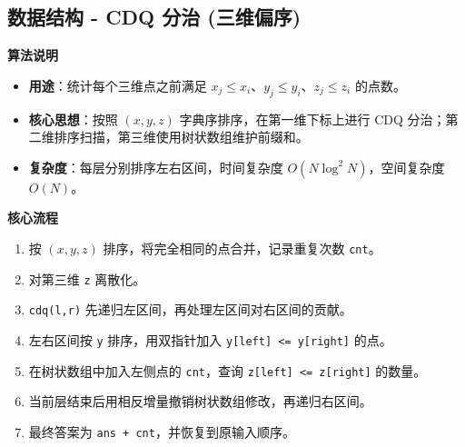 \documentclass[10pt,landscape,a4paper]{article}
\begin{document}
\begin{multicols*}{3}
\subsection*{数据结构 - CDQ 分治 (三维偏序)}
\par\addvspace{0.7ex}\noindent\textbf{算法说明}\par\nobreak
\begin{itemize}
\item \textbf{用途}：统计每个三维点之前满足 $x_j \le x_i$、$y_j \le y_i$、$z_j \le z_i$ 的点数。
\item \textbf{核心思想}：按照 $(x,y,z)$ 字典序排序，在第一维下标上进行 CDQ 分治；第二维排序扫描，第三维使用树状数组维护前缀和。
\item \textbf{复杂度}：每层分别排序左右区间，时间复杂度 $O(N\log^2N)$，空间复杂度 $O(N)$。
\end{itemize}
\par\addvspace{0.7ex}\noindent\textbf{核心流程}\par\nobreak
\begin{enumerate}[start=1]
\item 按 $(x,y,z)$ 排序，将完全相同的点合并，记录重复次数 \texttt{c\allowbreak{}n\allowbreak{}t}。
\item 对第三维 \texttt{z} 离散化。
\item \texttt{c\allowbreak{}d\allowbreak{}q\allowbreak{}(\allowbreak{}l\allowbreak{},\allowbreak{}r\allowbreak{})} 先递归左区间，再处理左区间对右区间的贡献。
\item 左右区间按 \texttt{y} 排序，用双指针加入 \texttt{y\allowbreak{}[\allowbreak{}l\allowbreak{}e\allowbreak{}f\allowbreak{}t\allowbreak{}]\allowbreak{} \allowbreak{}\textless{}\allowbreak{}=\allowbreak{} \allowbreak{}y\allowbreak{}[\allowbreak{}r\allowbreak{}i\allowbreak{}g\allowbreak{}h\allowbreak{}t\allowbreak{}]} 的点。
\item 在树状数组中加入左侧点的 \texttt{c\allowbreak{}n\allowbreak{}t}，查询 \texttt{z\allowbreak{}[\allowbreak{}l\allowbreak{}e\allowbreak{}f\allowbreak{}t\allowbreak{}]\allowbreak{} \allowbreak{}\textless{}\allowbreak{}=\allowbreak{} \allowbreak{}z\allowbreak{}[\allowbreak{}r\allowbreak{}i\allowbreak{}g\allowbreak{}h\allowbreak{}t\allowbreak{}]} 的数量。
\item 当前层结束后用相反增量撤销树状数组修改，再递归右区间。
\item 最终答案为 \texttt{a\allowbreak{}n\allowbreak{}s\allowbreak{} \allowbreak{}+\allowbreak{} \allowbreak{}c\allowbreak{}n\allowbreak{}t}，并恢复到原输入顺序。

\end{enumerate}
\end{multicols*}
\end{document}
